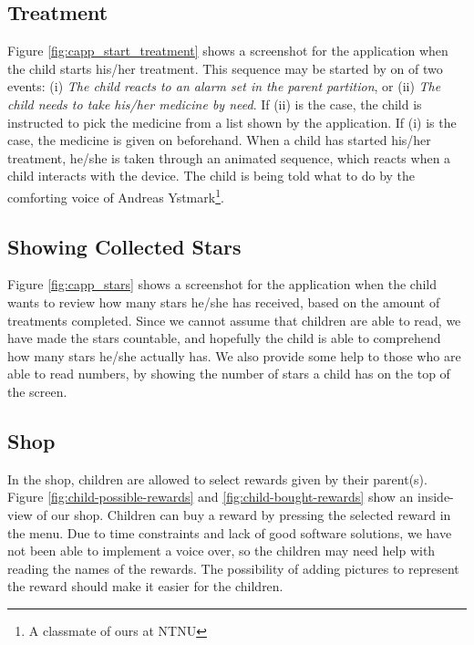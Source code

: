 \subsection{Treatment}
\label{sec:sec:description-treatment}
Figure \ref{fig:capp_start_treatment} shows a screenshot for the application when the child starts his/her treatment. This sequence may be started by on of two events: (i) \emph{The child reacts to an alarm set in the parent partition}, or (ii) \emph{The child needs to take his/her medicine by need}. If (ii) is the case, the child is instructed to pick the medicine from a list shown by the application. If (i) is the case, the medicine is given on beforehand. When a child has started his/her treatment, he/she is taken through an animated sequence, which reacts when a child interacts with the device. The child is being told what to do by the comforting voice of Andreas Ystmark\footnote{A classmate of ours at NTNU}.  


\subsection{Showing Collected Stars}
\label{sec:description-show-rewards}
Figure \ref{fig:capp_stars} shows a screenshot for the application when the child wants to review how many stars he/she has received, based on the amount of treatments completed. Since we cannot assume that children are able to read, we have made the stars countable, and hopefully the child is able to comprehend how many stars he/she actually has. We also provide some help to those who are able to read numbers, by showing the number of stars a child has on the top of the screen.      

\subsection{Shop}
\label{sec:description-shop}
In the shop, children are allowed to select rewards given by their parent(s). Figure \ref{fig:child-possible-rewards} and \ref{fig:child-bought-rewards} show an inside-view of our shop. Children can buy a reward by pressing the selected reward in the menu. Due to time constraints and lack of good software solutions, we have not been able to implement a voice over, so the children may need help with reading the names of the rewards. The possibility of adding pictures to represent the reward should make it easier for the children. 



